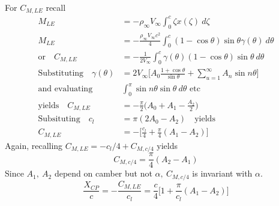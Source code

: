 \documentclass[draft=false, titlepage]{article}
\begin{document}
For $C_{M,LE}$ recall
\begin{align*}
    M_{LE} &= -\rho_\infty V_\infty\int_0^c \zeta x(\zeta)\ d\zeta\\
    M_{LE} &= -\frac{\rho_\infty V_\infty c^2}{4}\int_0^c(1-\cos\theta)\sin\theta \gamma(\theta)\ d\theta\\
    \text{or}\quad C_{M,LE} &= -\frac{1}{2 V_\infty} \int_0^c \gamma(\theta) (1-\cos\theta)\sin\theta\ d\theta\\
    \text{Substituting} \quad \gamma(\theta) &= 2V_\infty \Big[ A_0 \frac{1+\cos\theta}{\sin\theta} + \sum_{u=1}^\infty A_n\sin n\theta \Big]\\
    \text{and evaluating} \quad & \int_0^\pi \sin n \theta \sin \theta\ d\theta \text{ etc}\\
    \text{yields} \quad C_{M,LE} &= -\frac{\pi}{2} \Big( A_0 + A_1 - \frac{A_2}{2} \Big)\\
    \text{Subsituting} \quad c_l &= \pi(2A_0 - A_2) \quad \text{yields}\\
    C_{M,LE} &= -\Big[ \frac{c_l}{4} + \frac{\pi}{4} (A_1-A_2) \Big]
\end{align*}
Again, recalling $C_{M,LE} = -c_l/4 + C_{M,c/4}$ yields
\begin{equation*}
    C_{M,c/4} = \frac{\pi}{4} (A_2-A_1)
\end{equation*}
Since $A_1,\ A_2$ depend on camber but not $\alpha,\ C_{M,c/4}$ is invariant with $\alpha$.
\begin{equation*}
    \frac{X_{CP}}{c} = -\frac{C_{M,LE}}{c_l} = \frac{c}{4}\Big[ 1 + \frac{\pi}{c_l}(A_1-A_2) \Big]
\end{equation*}
\end{document}
